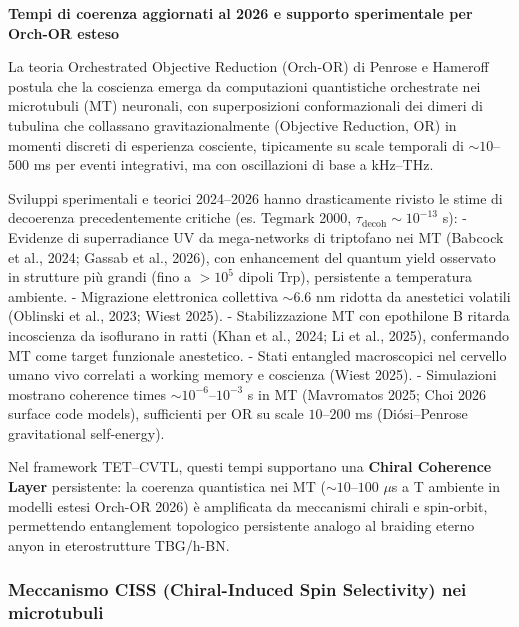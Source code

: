 \documentclass[11pt,a4paper]{article}
\theoremstyle{plain}
\theoremstyle{definition}
\begin{document}
\textbf{Tempi di coerenza aggiornati al 2026 e supporto sperimentale per Orch-OR esteso}

\vspace{0.4cm}

La teoria Orchestrated Objective Reduction (Orch-OR) di Penrose e Hameroff postula che la coscienza emerga da computazioni quantistiche orchestrate nei microtubuli (MT) neuronali, con superposizioni conformazionali dei dimeri di tubulina che collassano gravitazionalmente (Objective Reduction, OR) in momenti discreti di esperienza cosciente, tipicamente su scale temporali di $\sim 10$--$500$ ms per eventi integrativi, ma con oscillazioni di base a kHz--THz.

Sviluppi sperimentali e teorici 2024--2026 hanno drasticamente rivisto le stime di decoerenza precedentemente critiche (es. Tegmark 2000, $\tau_\text{decoh} \sim 10^{-13}$ s):  
- Evidenze di superradiance UV da mega-networks di triptofano nei MT (Babcock et al., 2024; Gassab et al., 2026), con enhancement del quantum yield osservato in strutture più grandi (fino a $>10^5$ dipoli Trp), persistente a temperatura ambiente.  
- Migrazione elettronica collettiva $\sim 6.6$ nm ridotta da anestetici volatili (Oblinski et al., 2023; Wiest 2025).  
- Stabilizzazione MT con epothilone B ritarda incoscienza da isoflurano in ratti (Khan et al., 2024; Li et al., 2025), confermando MT come target funzionale anestetico.  
- Stati entangled macroscopici nel cervello umano vivo correlati a working memory e coscienza (Wiest 2025).  
- Simulazioni mostrano coherence times $\sim 10^{-6}$--$10^{-3}$ s in MT (Mavromatos 2025; Choi 2026 surface code models), sufficienti per OR su scale $10$--$200$ ms (Diósi–Penrose gravitational self-energy).

Nel framework TET–CVTL, questi tempi supportano una \textbf{Chiral Coherence Layer} persistente: la coerenza quantistica nei MT ($\sim 10$--$100$ $\mu$s a T ambiente in modelli estesi Orch-OR 2026) è amplificata da meccanismi chirali e spin-orbit, permettendo entanglement topologico persistente analogo al braiding eterno anyon in eterostrutture TBG/h-BN.


\vspace{0.4cm}

\subsubsection{Meccanismo CISS (Chiral-Induced Spin Selectivity) nei microtubuli}
\end{document}

